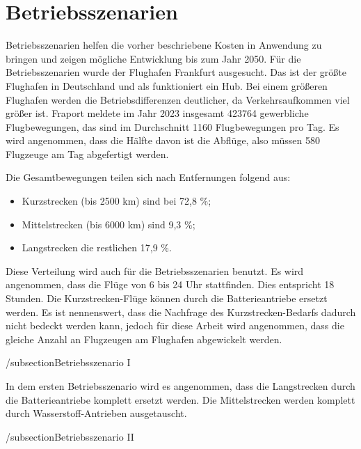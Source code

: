 
\section{Betriebsszenarien}
Betriebsszenarien helfen die vorher beschriebene Kosten in Anwendung zu bringen und zeigen mögliche Entwicklung bis zum Jahr 2050.
Für die Betriebsszenarien wurde der Flughafen Frankfurt ausgesucht. Das ist der größte Flughafen in Deutschland und als 
funktioniert ein Hub. Bei einem größeren Flughafen werden die Betriebsdifferenzen deutlicher, da Verkehrsaufkommen viel größer ist.
Fraport meldete im Jahr 2023 insgesamt 423764 gewerbliche Flugbewegungen, das sind im Durchschnitt 1160 Flugbewegungen pro Tag. 
Es wird angenommen, dass die Hälfte davon ist die Abflüge, also müssen 580 Flugzeuge am Tag abgefertigt werden.

Die Gesamtbewegungen teilen sich nach Entfernungen folgend aus:
\begin{itemize}
    \item Kurzstrecken (bis 2500 km) sind bei 72,8 \%;
    \item Mittelstrecken (bis 6000 km) sind 9,3 \%;
    \item Langstrecken die restlichen 17,9 \%. 
    \end{itemize}
Diese Verteilung wird auch für die Betriebsszenarien benutzt. Es wird angenommen, dass die Flüge von 6 bis 24 Uhr stattfinden. Dies entspricht
18 Stunden.
Die Kurzstrecken-Flüge können durch die Batterieantriebe ersetzt werden. 
Es ist nennenswert, dass die Nachfrage des Kurzstrecken-Bedarfs dadurch nicht bedeckt werden kann, jedoch für diese Arbeit wird angenommen,
dass die gleiche Anzahl an Flugzeugen am Flughafen abgewickelt werden.



/subsection{Betriebsszenario I}

In dem ersten Betriebsszenario wird es angenommen, dass die Langstrecken durch die Batterieantriebe komplett ersetzt werden.
Die Mittelstrecken werden komplett durch Wasserstoff-Antrieben ausgetauscht.

/subsection{Betriebsszenario II}